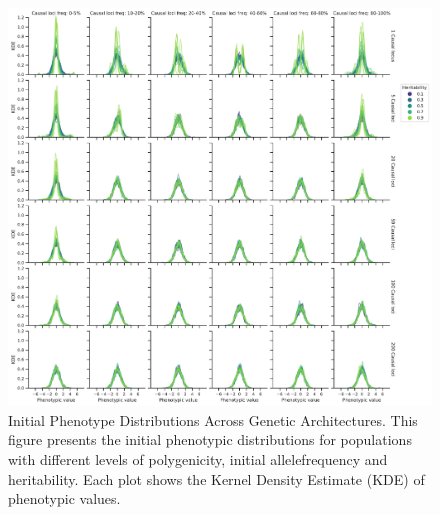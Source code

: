 \documentclass{article}
\begin{document}
\setcounter{figure}{0}
\renewcommand{\thefigure}{S\arabic{figure}}
\begin{figure}[b]
    \centering
    \includegraphics[width=1\textwidth]{figures/phenotypes_initial-3.pdf}
    \caption{Initial Phenotype Distributions Across Genetic Architectures. This figure presents the initial phenotypic distributions for populations with different levels of polygenicity, initial allelefrequency and heritability. Each plot shows the Kernel Density Estimate (KDE) of phenotypic values.}
    \label{fig:phenotypes_initial}
\end{figure}
\end{document}
